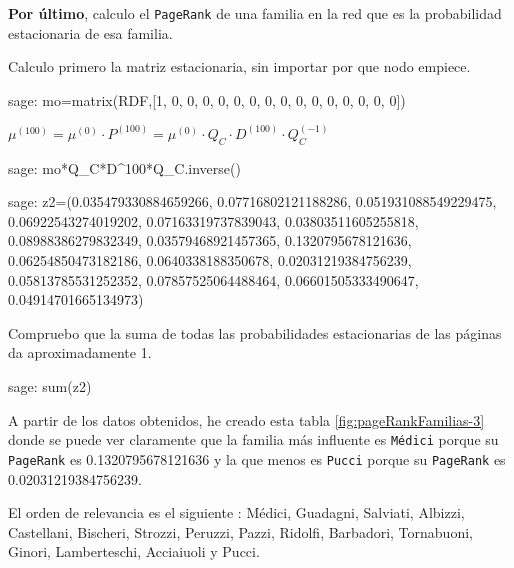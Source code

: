 \par \textbf{Por último}, calculo el \texttt{PageRank} de una familia en la red que es la probabilidad estacionaria de esa familia.
\par Calculo primero la matriz estacionaria, sin importar por que nodo empiece.
\begin{sagecommandline}
    sage: mo=matrix(RDF,[1, 0, 0, 0, 0, 0, 0, 0, 0, 0, 0, 0, 0, 0, 0, 0])
\end{sagecommandline}
\par $\mu^{(100)} = \mu^{(0)} \cdot P^{(100)} = \mu^{(0)} \cdot Q_C \cdot D^{(100)} \cdot Q_C^{(-1)}$
\begin{sagecommandline}
    sage: mo*Q_C*D^100*Q_C.inverse()
\end{sagecommandline}

\begin{sagecommandline}
    sage: z2=(0.035479330884659266, 0.07716802121188286, 0.051931088549229475, 0.06922543274019202, 0.07163319737839043, 0.03803511605255818, 0.08988386279832349, 0.03579468921457365, 0.1320795678121636, 0.06254850473182186, 0.0640338188350678, 0.02031219384756239, 0.05813785531252352, 0.07857525064488464, 0.06601505333490647, 0.04914701665134973)
\end{sagecommandline}

\par Compruebo que la suma de todas las probabilidades estacionarias de las páginas da aproximadamente 1.
\begin{sagecommandline}
    sage: sum(z2)
\end{sagecommandline}

\par A partir de los datos obtenidos, he creado esta tabla \ref{fig:pageRankFamilias-3} donde se puede ver claramente que 
la familia más influente es \texttt{Médici} porque su \texttt{PageRank} es 0.1320795678121636 y la que menos es 
\texttt{Pucci} porque su \texttt{PageRank} es 0.02031219384756239.
\par El orden de relevancia es el siguiente : Médici, Guadagni, Salviati, Albizzi, Castellani, Bischeri, Strozzi, Peruzzi,  Pazzi,
Ridolfi, Barbadori, Tornabuoni, Ginori, Lamberteschi, Acciaiuoli  y Pucci.


